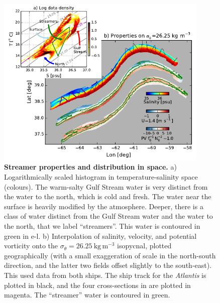 \documentclass{natureJMK}
\begin{document}
\begin{figure}[htbp]
  \centering
    \includegraphics[width=0.9\textwidth]{./ComposeTSfigNew.pdf}
  \caption{{\bf Streamer properties and distribution in space.}
a) Logarithmically scaled histogram
 in temperature-salinity space (colours). The warm-salty Gulf Stream water is very distinct from the water to the north, which is cold and fresh.  The water near the surface is heavily modified by the atmosphere.  Deeper, there is a class of water distinct from the Gulf Stream water and the water to the north, that we label ``streamers''.  This water is contoured in green in e-l.  b) Interpolation of salinity, velocity, and potential vorticity onto the $\sigma_{\theta}=26.25\ \mathrm{kg\,m^{-3}}$ isopycnal, plotted geographically (with a small exaggeration of scale in the north-south direction, and the latter two fields offset slightly to the south-east). This used data from both ships.  The ship track for the \emph{Atlantis} is plotted in black, and the four cross-sections in  are plotted in magenta.  The ``streamer'' water is contoured in green.  
  } \label{fig:ComposeTSfigNew}
\end{figure}
\end{document}
